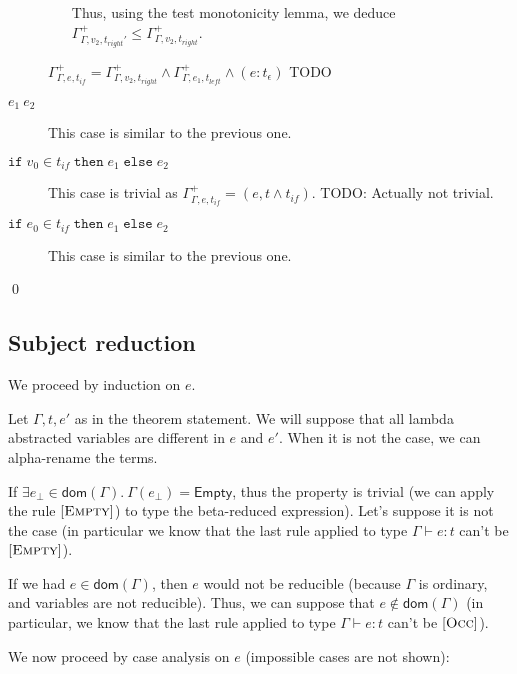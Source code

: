 \documentclass[a4paper]{article}%
\newcommand{\dom}[1]{\textsf{dom}(#1)}
\newcommand{\Empty} {\textsf{Empty}}%
\newcommand{\ite}[4]{\ensuremath{\texttt{if}\;#1\in#2\;\texttt{then}\;#3\;\texttt{else}\;#4}}
\theoremstyle{definition}
\newcommand {\Rule}[1] {[\textsc{#1}]}
\begin{document}
\begin{description}
\begin{itemize}
            Thus, using the test monotonicity lemma, we deduce $\Gamma^+_{\Gamma,v_2,t_{right}'} \leq \Gamma^+_{\Gamma,v_2,t_{right}}$.
          \end{itemize}
          
          $\Gamma^+_{\Gamma,e,t_{if}} = \Gamma^+_{\Gamma,v_2,t_{right}} \land \Gamma^+_{\Gamma,e_1,t_{left}} \land (e:t_\epsilon)$ TODO
    
          \item[$e_1\ e_2$] This case is similar to the previous one.
          \item[$\ite {v_0} {t_{if}} {e_1} {e_2}$] This case is trivial as $\Gamma^+_{\Gamma,e,t_{if}} = (e, t\land t_{if})$. TODO: Actually not trivial.
          \item[$\ite {e_0} {t_{if}} {e_1} {e_2}$] This case is similar to the previous one.
        \end{description}
    
        \qed
    
        \subsection{Subject reduction}
    
        We proceed by induction on $e$.
    
        Let $\Gamma,t,e'$ as in the theorem statement.
        We will suppose that all lambda abstracted variables are different in $e$ and $e'$. When it is not the case, we can alpha-rename the terms.
    
        If $\exists e_{\bot} \in \dom\Gamma.\ \Gamma(e_{\bot}) = \Empty$, thus the property is trivial
        (we can apply the rule $\Rule {Empty}$) to type the beta-reduced expression).
        Let's suppose it is not the case (in particular we know that the last rule applied to type $\Gamma \vdash e:t$ can't be $\Rule{Empty}$).
    
        If we had $e\in\dom\Gamma$, then $e$ would not be reducible (because $\Gamma$ is ordinary, and variables are not reducible).
        Thus, we can suppose that $e\not\in\dom\Gamma$ (in particular, we know that the last rule applied to type $\Gamma \vdash e:t$ can't be $\Rule{Occ}$).
    
        We now proceed by case analysis on $e$ (impossible cases are not shown):
    
\end{document}
